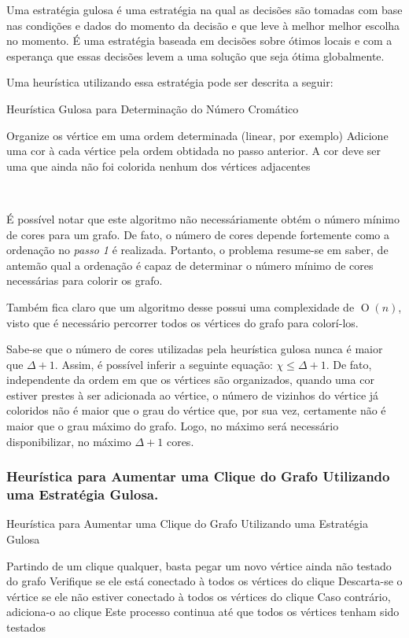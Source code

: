\documentclass[12pt]{article}
\newcommand{\BigO}[1]{\ensuremath{\operatorname{O}\left(#1\right)}}
\begin{document}
Uma estratégia gulosa é uma estratégia na qual as decisões são tomadas com base nas condições e dados do momento da decisão e que leve à melhor melhor escolha no momento. É uma estratégia baseada em decisões sobre ótimos locais e com a esperança que essas decisões levem a uma solução que seja ótima globalmente.

Uma heurística utilizando essa estratégia pode ser descrita a seguir:

\begin{algorithm}[H]
  \caption{Heurística Gulosa para Determinação do Número Cromático}
  \SetAlgoLined
  Organize os vértice em uma ordem determinada (linear, por exemplo)\;
  Adicione uma cor à cada vértice pela ordem obtidada no passo anterior. A cor deve ser uma que ainda não foi colorida nenhum dos vértices adjacentes\;
\end{algorithm}\ %
 
É possível notar que este algoritmo não necessáriamente obtém o número mínimo de cores para um grafo. De fato, o número de cores depende fortemente como a ordenação no \emph{passo 1} é realizada. Portanto, o problema resume-se em saber, de antemão qual a ordenação é capaz de determinar o número mínimo de cores necessárias para colorir os grafo.

Também fica claro que um algoritmo desse possui uma complexidade de $\BigO{n}$, visto que é necessário percorrer todos os vértices do grafo para colorí-los.

Sabe-se que o número de cores utilizadas pela heurística gulosa nunca é maior que $\Delta + 1$. Assim, é possível inferir a seguinte equação: $\chi \leq \Delta + 1$. De fato, independente da ordem em que os vértices são organizados, quando uma cor estiver prestes à ser adicionada ao vértice, o número de vizinhos do vértice já coloridos não é maior que o grau do vértice que, por sua vez, certamente não é maior que o grau máximo do grafo. Logo, no máximo será necessário disponibilizar, no máximo $\Delta + 1$ cores.

\subsubsection{Heurística para Aumentar uma Clique do Grafo Utilizando uma Estratégia Gulosa.}

\begin{algorithm}[H]
  \caption{Heurística para Aumentar uma Clique do Grafo Utilizando uma Estratégia Gulosa}
  \SetAlgoLined
  Partindo de um clique qualquer, basta pegar um novo vértice ainda não testado do grafo\;
  Verifique se ele está conectado à todos os vértices do clique\;
  Descarta-se o vértice se ele não estiver conectado à todos os vértices do clique\;
  Caso contrário, adiciona-o ao clique\;
  Este processo continua até que todos os vértices tenham sido testados\
\end{algorithm}\ %
\end{document}
